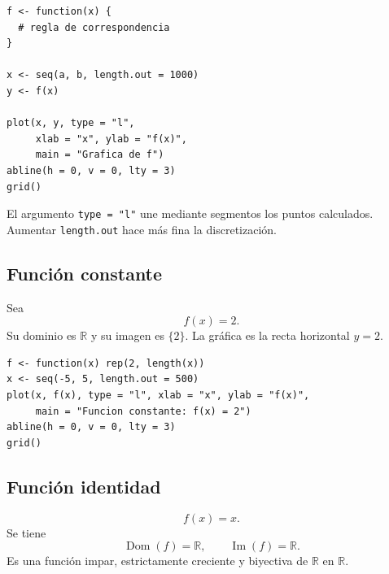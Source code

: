 \documentclass[12pt]{article}
\theoremstyle{remark}
\newcommand{\R}{\mathbb{R}}
\newcommand{\Dom}{\operatorname{Dom}}
\newcommand{\Ima}{\operatorname{Im}}
\begin{document}
\begin{verbatim}
f <- function(x) {
  # regla de correspondencia
}

x <- seq(a, b, length.out = 1000)
y <- f(x)

plot(x, y, type = "l",
     xlab = "x", ylab = "f(x)",
     main = "Grafica de f")
abline(h = 0, v = 0, lty = 3)
grid()
\end{verbatim}

El argumento \texttt{type = "l"} une mediante segmentos los puntos calculados.
Aumentar \texttt{length.out} hace más fina la discretización.

\subsection{Función constante}

Sea
\[
f(x)=2.
\]
Su dominio es $\R$ y su imagen es $\{2\}$. La gráfica es la recta horizontal
$y=2$.

\begin{center}
\end{center}

\begin{verbatim}
f <- function(x) rep(2, length(x))
x <- seq(-5, 5, length.out = 500)
plot(x, f(x), type = "l", xlab = "x", ylab = "f(x)",
     main = "Funcion constante: f(x) = 2")
abline(h = 0, v = 0, lty = 3)
grid()
\end{verbatim}

\subsection{Función identidad}

\[
f(x)=x.
\]
Se tiene
\[
\Dom(f)=\R,\qquad \Ima(f)=\R.
\]
Es una función impar, estrictamente creciente y biyectiva de $\R$ en $\R$.

\begin{center}
\end{center}
\end{document}
